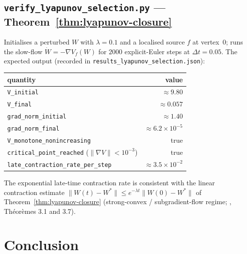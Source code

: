 \documentclass[11pt]{article}
\theoremstyle{definition}
\begin{document}
\subsection*{\texttt{verify\_lyapunov\_selection.py} — Theorem~\ref{thm:lyapunov-closure}}

Initialises a perturbed $W$ with $\lambda = 0.1$ and a localised source $f$ at
vertex~$0$; runs the slow-flow $\dot W = -\nabla V_f(W)$ for $2000$ explicit-Euler
steps at $\Delta t = 0.05$. The expected output (recorded in
\texttt{results\_lyapunov\_selection.json}):

\begin{center}\small
\begin{tabular}{@{}lr@{}}
\toprule
quantity & value \\
\midrule
\texttt{V\_initial} & $\approx 9.80$ \\
\texttt{V\_final} & $\approx 0.057$ \\
\texttt{grad\_norm\_initial} & $\approx 1.40$ \\
\texttt{grad\_norm\_final} & $\approx 6.2 \times 10^{-5}$ \\
\texttt{V\_monotone\_nonincreasing} & true \\
\texttt{critical\_point\_reached} ($\|\nabla V\| < 10^{-3}$) & true \\
\texttt{late\_contraction\_rate\_per\_step} & $\approx 3.5 \times 10^{-2}$ \\
\bottomrule
\end{tabular}
\end{center}

The exponential late-time contraction rate is consistent with the linear
contraction estimate $\|W(t) - W^*\| \leq e^{-\lambda t}\|W(0) - W^*\|$
of Theorem~\ref{thm:lyapunov-closure} (strong-convex / subgradient-flow
regime; \citep{Brezis1973}, Théorèmes 3.1 and 3.7).

\section{Conclusion}\label{sec:conclusion}
\end{document}
